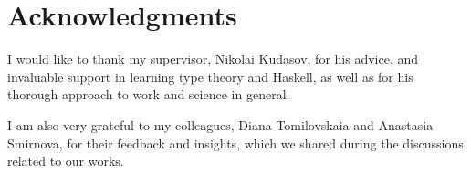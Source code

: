 \chapter{Acknowledgments}
\label{chap:ack}

I would like to thank my supervisor, Nikolai Kudasov, for his advice, and invaluable support in learning type theory and Haskell, as well as for his thorough approach to work and science in general.

I am also very grateful to my colleagues, Diana Tomilovskaia and Anastasia Smirnova, for their feedback and insights, which we shared during the discussions related to our works.
